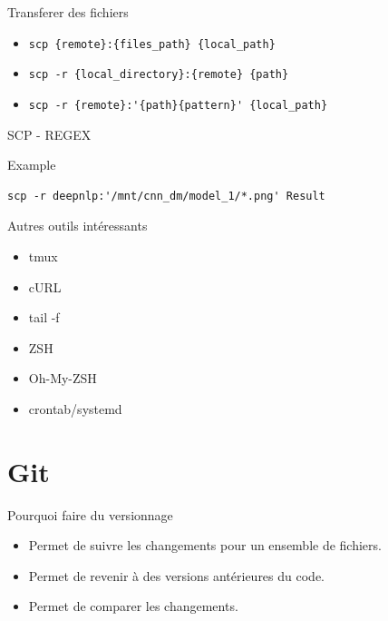 \documentclass[11pt]{beamer}
\begin{document}
\begin{frame}[fragile]{Transferer des fichiers}
	\begin{itemize}[<+->]
		\item \verb|scp {remote}:{files_path} {local_path}|
		\item \verb|scp -r {local_directory}:{remote} {path}|
		\item \verb|scp -r {remote}:'{path}{pattern}' {local_path}| 
	\end{itemize}
\end{frame}

\begin{frame}[fragile]{SCP - REGEX}
\begin{block}{Example}
\begin{lstlisting}
scp -r deepnlp:'/mnt/cnn_dm/model_1/*.png' Result
\end{lstlisting}
\end{block}
\end{frame}

\begin{frame}[fragile]{Autres outils intéressants}
	\begin{itemize}
		\item tmux
		\item cURL
		\item tail -f
		\item ZSH
		\item Oh-My-ZSH
		\item crontab/systemd
	\end{itemize}
\end{frame}


\section{Git}


\begin{frame}{Pourquoi faire du versionnage}
	\begin{itemize}[<+->]
		\item Permet de suivre les changements pour un ensemble de fichiers.
		\item Permet de revenir à des versions antérieures du code.
		\item Permet de comparer les changements.
	\end{itemize}
\end{frame}
\end{document}
